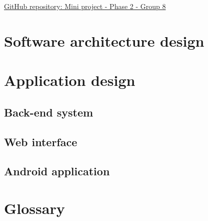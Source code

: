 \documentclass[12pt]{article}
\begin{document}
	\newpage
	\tableofcontents
	
	\vspace{0.5in}
	
	\begin{flushleft}
		\LARGE\href{https://github.com/mox1990/COS_301_GROUP8_Phase_2}{GitHub repository: Mini project - Phase 2 -  Group 8}
	\end{flushleft}
	
	\newpage
	\section{Software architecture design}
	
		\vspace{0.2in}
		
		
		
	\section{Application design}
	
		\vspace{0.2in}
		
		
		
	\subsection{Back-end system}

		\vspace{0.2in}
		
		
		
		
	\subsection{Web interface}

	\vspace{0.2in}
	
	
	\newpage
	\subsection{Android application}
			
	\vspace{0.2in}
	
	
	
	
	\vspace{0.2in}

	
	\newpage	
	\section{Glossary}
	
\end{document}
